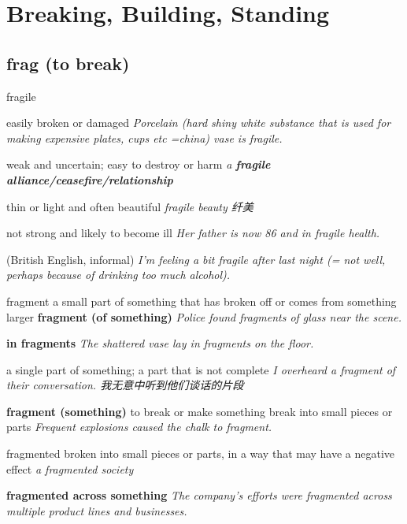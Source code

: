 \chapter{Breaking, Building, Standing}

\section{frag (to break)}

\begin{DefWord}{fragile}

    easily broken or damaged
    \textit{Porcelain (hard shiny white substance that is used for making expensive plates, cups etc =china) vase is fragile.}

    weak and uncertain; easy to destroy or harm
    \textit{a \textbf{fragile alliance/ceasefire/relationship}}

    thin or light and often beautiful
    \textit{fragile beauty 纤美}

    not strong and likely to become ill
    \textit{Her father is now 86 and in fragile health.}

    (British English, informal) \textit{I'm feeling a bit fragile after last night (= not well, perhaps because of drinking too much alcohol).}
\end{DefWord}

\begin{DefWord}{fragment}
    a small part of something that has broken off or comes from something larger
    \textbf{fragment (of something)} \textit{Police found fragments of glass near the scene.}

    \textbf{in fragments} \textit{The shattered vase lay in fragments on the floor.}

    a single part of something; a part that is not complete
    \textit{I overheard a fragment of their conversation. 我无意中听到他们谈话的片段}

    \textbf{fragment (something)} to break or make something break into small pieces or parts
    \textit{Frequent explosions caused the chalk to fragment.}
\end{DefWord}


\begin{DefWord}{fragmented}
    broken into small pieces or parts, in a way that may have a negative effect
    \textit{a fragmented society}

    \textbf{fragmented across something} \textit{The company's efforts were fragmented across multiple product lines and businesses.}

\end{DefWord}

